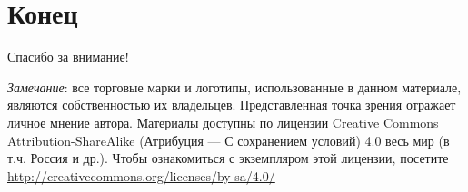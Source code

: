 \documentclass{beamer}
\begin{document}
\section{Конец}
\begin{frame}

{\huge{Спасибо за внимание!}\par}

\vfill

\vfill

\tiny{\textit{Замечание}: все торговые марки и логотипы, использованные в данном материале, являются собственностью их владельцев. Представленная точка зрения отражает личное мнение автора. Материалы доступны по лицензии Creative Commons Attribution-ShareAlike (Атрибуция — С сохранением условий) 4.0 весь мир (в т.ч. Россия и др.). Чтобы ознакомиться с экземпляром этой лицензии, посетите \url{http://creativecommons.org/licenses/by-sa/4.0/}}

\end{frame}

\end{document}

